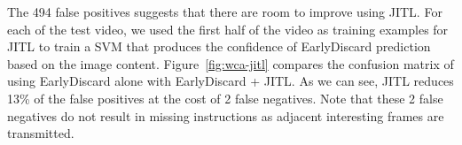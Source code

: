 The 494 false positives suggests that there are room to improve using JITL. For
each of the test video, we used the first half of the video as training examples
for JITL to train a SVM that produces the confidence of EarlyDiscard prediction
based on the image content. Figure~\ref{fig:wca-jitl} compares the confusion
matrix of using EarlyDiscard alone with EarlyDiscard + JITL. As we can see, JITL
reduces 13\% of the false positives at the cost of 2 false negatives. Note that
these 2 false negatives do not result in missing instructions as adjacent
interesting frames are transmitted. 


